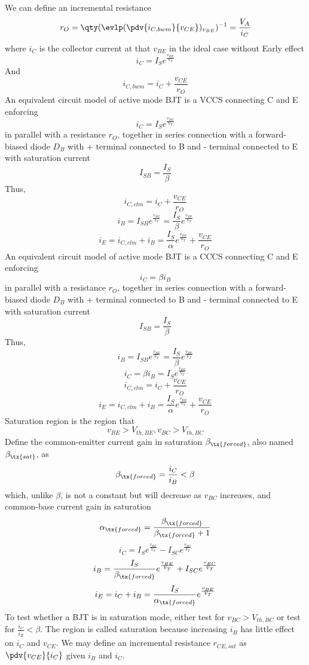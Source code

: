 \documentclass[a4paper,12pt]{report}
\begin{document}
We can define an incremental resistance
\[r_O=\qty(\evlp(\pdv{i_{C,bwm}}{v_{CE}})_{v_{BE}})^{-1}=\frac{V_A}{i_C}\]
where $i_C$ is the collector current at that $v_{BE}$ in the ideal case without Early effect
\[i_C=I_Se^{\frac{v_{BE}}{V_T}}\]
And
\[i_{C,bwm}=i_C+\frac{v_{CE}}{r_O}\]
An equivalent circuit model of active mode BJT is a VCCS connecting C and E enforcing
\[i_C=I_Se^{\frac{v_{BE}}{V_T}}\]
in parallel with a resistance $r_O$, together in series connection with a forward-biased diode $D_B$ with + terminal connected to B and - terminal connected to E with saturation current
\[I_{SB}=\frac{I_S}{\beta}\]
Thus,
\[i_{C,clm}=i_C+\frac{v_{CE}}{r_O}\]
\[i_B=I_{SB}e^{\frac{v_{BE}}{V_T}}=\frac{I_S}{\beta}e^{\frac{v_{BE}}{V_T}}\]
\[i_E=i_{C,clm}+i_B=\frac{I_S}{\alpha}e^{\frac{v_{BE}}{V_T}}+\frac{v_{CE}}{r_O}\]
An equivalent circuit model of active mode BJT is a CCCS connecting C and E enforcing
\[i_C=\beta i_B\]
in parallel with a resistance $r_O$, together in series connection with a forward-biased diode $D_B$ with + terminal connected to B and - terminal connected to E with saturation current
\[I_{SB}=\frac{I_S}{\beta}\]
Thus,
\[i_B=I_{SB}e^{\frac{v_{BE}}{V_T}}=\frac{I_S}{\beta}e^{\frac{v_{BE}}{V_T}}\]
\[i_C=\beta i_B=I_Se^{\frac{v_{BE}}{V_T}}\]
\[i_{C,clm}=i_C+\frac{v_{CE}}{r_O}\]
\[i_E=i_{C,clm}+i_B=\frac{I_S}{\alpha}e^{\frac{v_{BE}}{V_T}}+\frac{v_{CE}}{r_O}\]
Saturation region is the region that
\[v_{BE}>V_{th,BE},v_{BC}>V_{th,BC}\]
Define the common-emitter current gain in saturation $\beta_{\tx{forced}}$, also named $\beta_{\tx{sat}}$, as
\[\beta_{\tx{forced}}=\frac{i_C}{i_B}<\beta\]
which, unlike $\beta$, is not a constant but will decrease as $v_{BC}$ increases, and common-base current gain in saturation
\[\alpha_{\tx{forced}}=\frac{\beta_{\tx{forced}}}{\beta_{\tx{forced}}+1}\]
\[i_C=I_Se^{\frac{v_{BE}}{V_T}}-I_{SC}e^{\frac{v_{BC}}{V_T}}\]
\[i_B=\frac{I_S}{\beta_{\tx{forced}}}e^{\frac{v_{BE}}{V_T}}+I_{SC}e^{\frac{v_{BC}}{V_T}}\]
\[i_E=i_C+i_B=\frac{I_S}{\alpha_{\tx{forced}}}e^{\frac{v_{BE}}{V_T}}\]
To test whether a BJT is in saturation mode, either test for $v_{BC}>V_{th,BC}$ or test for $\frac{i_C}{i_B}<\beta$. The region is called saturation because increasing $i_B$ has little effect on $i_C$ and $v_{CE}$. We may define an incremental resistance $r_{CE,sat}$ as $\pdv{v_{CE}}{i_C}$ given $i_B$ and $i_C$.
\end{document}
